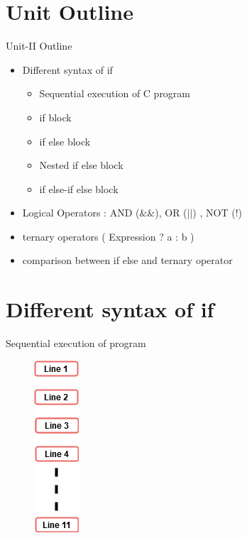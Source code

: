 \documentclass[10pt,a4paper]{beamer}
\begin{document}
\section{Unit Outline}
    \begin{frame}{Unit-II Outline}
        \begin{itemize}
          
            \item Different syntax of if 
                \begin{itemize}
                        \item  Sequential execution of C program
                         \item if block
                            \item if else block
                            \item Nested if else block
                            \item if else-if else block
                \end{itemize}
       
            \item Logical Operators : AND ($\&\&$), OR ($||$) , NOT (!)
            \item ternary operators ( Expression ? a : b )
            \item comparison between if else and ternary operator
        \end{itemize}
    \end{frame}

\section{Different syntax of if }
    \begin{frame}{Sequential execution of program}
        \begin{minipage}{0.6 \textwidth}
                
        \end{minipage}%
         \begin{minipage}{0.4\textwidth}
                \begin{figure}
            	    \centering
            	    \includegraphics[height=5 cm, width=2 cm]{images/Sequential_execution.png}
        	\end{figure}
        \end{minipage}
    \end{frame}
    
\end{document}
